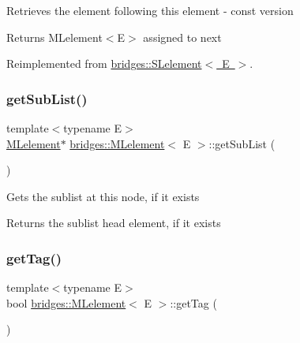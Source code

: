 Retrieves the element following this element -\/ const version

\begin{DoxyReturn}{Returns}
M\+Lelement$<$\+E$>$ assigned to next 
\end{DoxyReturn}


Reimplemented from \mbox{\hyperlink{classbridges_1_1_s_lelement_a4422b7731a84734d312b8cd8e241b1e8}{bridges\+::\+S\+Lelement$<$ E $>$}}.

\mbox{\label{classbridges_1_1_m_lelement_a55f82b59284e22caef23959e023614cc}} 
\subsubsection{\texorpdfstring{get\+Sub\+List()}{getSubList()}}
{\footnotesize\ttfamily template$<$typename E$>$ \\
\mbox{\hyperlink{classbridges_1_1_m_lelement}{M\+Lelement}}$\ast$ \mbox{\hyperlink{classbridges_1_1_m_lelement}{bridges\+::\+M\+Lelement}}$<$ E $>$\+::get\+Sub\+List (\begin{DoxyParamCaption}{ }\end{DoxyParamCaption})\hspace{0.3cm}{\ttfamily [inline]}}

Gets the sublist at this node, if it exists

\begin{DoxyReturn}{Returns}
the sublist head element, if it exists 
\end{DoxyReturn}
\mbox{\label{classbridges_1_1_m_lelement_a7ac084867fd83d7742f0a305e44e523a}} 
\subsubsection{\texorpdfstring{get\+Tag()}{getTag()}}
{\footnotesize\ttfamily template$<$typename E$>$ \\
bool \mbox{\hyperlink{classbridges_1_1_m_lelement}{bridges\+::\+M\+Lelement}}$<$ E $>$\+::get\+Tag (\begin{DoxyParamCaption}{ }\end{DoxyParamCaption})\hspace{0.3cm}{\ttfamily [inline]}}

